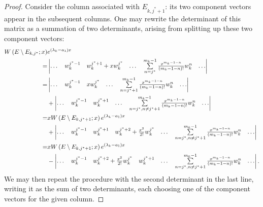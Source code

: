 \documentclass{article}
\begin{document}
\begin{proof}
Consider the column associated with $E_{k,j^*+1}$:
its two component vectors appear in the subsequent columns.
One may rewrite the determinant of this matrix as a summation of two determinants, arising from splitting up these two component vectors:
\begin{equation*}
\begin{split}
W \left ( E \setminus E_{k,j^*} ; x \right ) & e^{(\lambda_k - a_1) x} \\
= & \begin{vmatrix} \dots & w_k^{j^*-1} & w_k^{j^*+1} + x w_k^{j^*} & \dots & \sum\limits_{n=j^*}^{m_k-1} \frac{x^{m_k-1-n}}{(m_k-1-n)!} w_k^n & \dots \end{vmatrix} \\
= & \begin{vmatrix} \dots & w_k^{j^*-1} & x w_k^{j^*} & \dots & \sum\limits_{n=j^*+1}^{m_k-1} \frac{x^{m_k-1-n}}{(m_k-1-n)!} w_k^n & \dots \end{vmatrix} \\
& + \begin{vmatrix} \dots & w_k^{j^*-1} & w_k^{j^*+1} & \dots & \sum\limits_{n=j^*, n\neq j^*+1}^{m_k-1} \frac{x^{m_k-1-n}}{(m_k-1-n)!} w_k^n & \dots \end{vmatrix} \\
= & x W \left ( E \setminus E_{k,j^*+1} ; x \right ) e^{(\lambda_k - a_1) x} \\
& + \begin{vmatrix} \dots & w_k^{j^*-1} & w_k^{j^*+1} & w_k^{j^*+2} + \frac{x^2}{2!} w_k^{j^*} & \dots & \sum\limits_{n=j^*, n\neq j^*+1}^{m_k-1} \frac{x^{m_k-1-n}}{(m_k-1-n)!} w_k^n & \dots \end{vmatrix} \\
= & x W \left ( E \setminus E_{k,j^*+1} ; x \right ) e^{(\lambda_k - a_1) x} \\
& - \begin{vmatrix} \dots & w_k^{j^*-1} & w_k^{j^*+2} + \frac{x^2}{2!} w_k^{j^*} & w_k^{j^*+1} & \dots & \sum\limits_{n=j^*, n\neq j^*+1}^{m_k-1} \frac{x^{m_k-1-n}}{(m_k-1-n)!} w_k^n & \dots \end{vmatrix} .
\end{split}
\end{equation*}
We may then repeat the procedure with the second determinant in the last line, writing it as the sum of two determinants, each choosing one of the component vectors for the given column.


\end{proof}
\end{document}
